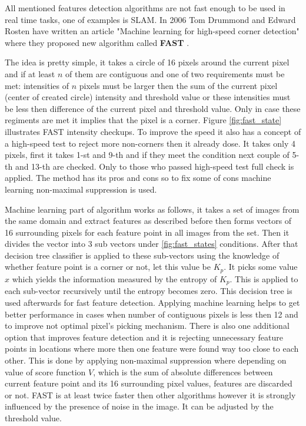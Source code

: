 \documentclass[../../../../main]{subfiles}
\begin{document}
All mentioned features detection algorithms are not fast enough to be used in real time tasks, one of examples is \ac{SLAM}. In 2006 Tom Drummond and Edward Rosten have written an article "Machine learning for high-speed corner detection" where they proposed new algorithm called \textbf{\ac{FAST}} \cite{machine_learning_high_speed_corner_rosten}.

The idea is pretty simple, it takes a circle of 16 pixels around the current pixel and if at least $n$ of them are contiguous and one of two requirements must be met: intensities of $n$ pixels must be larger then the sum of the current pixel (center of created circle) intensity and threshold value or these intensities must be less then difference of the current pixel and threshold value. Only in case these regiments are met it implies that the pixel is a corner. Figure \ref{fig:fast_state} illustrates \ac{FAST} intensity checkups. To improve the speed it also has a concept of a high-speed test to reject more non-corners then it already dose. It takes only 4 pixels, first it takes 1-st and 9-th and if they meet the condition next couple of 5-th and 13-th are checked. Only to those who passed high-speed test full check is applied. The method has its pros and cons so to fix some of cons machine learning non-maximal suppression is used.

Machine learning part of algorithm works as follows, it takes a set of images from the same domain and extract features as described before then forms vectors of 16 surrounding pixels for each feature point in all images from the set. Then it divides the vector into 3 sub vectors under \ref{fig:fast_states} conditions. After that decision tree classifier is applied to these sub-vectors using the knowledge of whether feature point is a corner or not, let this value be $K_p$. It picks some value $x$ which yields the information measured by the entropy of $K_p$. This is applied to each sub-vector recursively until the entropy becomes zero. This decision tree is used afterwards for fast feature detection. Applying machine learning helps to get better performance in cases when number of contiguous pixels is less then 12 and to improve not optimal pixel's picking mechanism. There is also one additional option that improves feature detection and it is rejecting unnecessary feature points in locations where more then one feature were found way too close to each other. This is done by applying non-maximal suppression where depending on value of score function $V$, which is the sum of absolute differences between current feature point and its 16 surrounding pixel values, features are discarded or not. \ac{FAST} is at least twice faster then other algorithms however it is strongly influenced by the presence of noise in the image. It can be adjusted by the threshold value.
\end{document}
